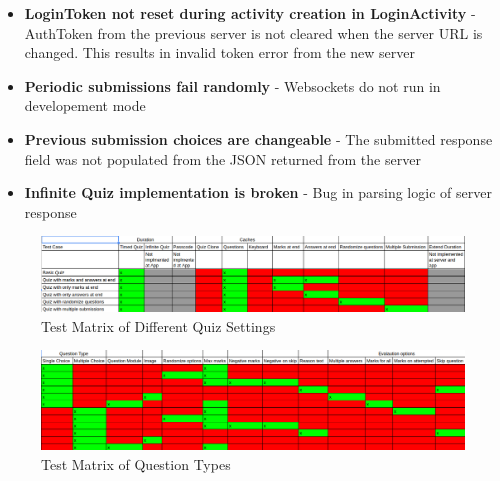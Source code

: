 \begin{itemize}
        \item \textbf{LoginToken not reset during activity creation in LoginActivity} - AuthToken from the previous server is not cleared when the server URL is changed. This results in invalid token error from the new server
        
        \item \textbf{Periodic submissions fail randomly} - Websockets do not run in developement mode
        
        \item \textbf{Previous submission choices are changeable} - The submitted response field was not populated from the JSON returned from the server
        
        \item \textbf{Infinite Quiz implementation is broken} - Bug in parsing logic of server response
    
    \end{itemize}
    
\begin{figure}[h!]
\begin{center}
\includegraphics[scale=.4]{diagrams/test-matrix-1} 
\vspace{1cm}
\caption{Test Matrix of Different Quiz Settings}
\end{center}
\end{figure}


\begin{figure}[h!]
\begin{center}
\includegraphics[scale=.4]{diagrams/test-matrix-2} 
\vspace{1cm}
\caption{Test Matrix of Question Types}
\end{center}
\end{figure}